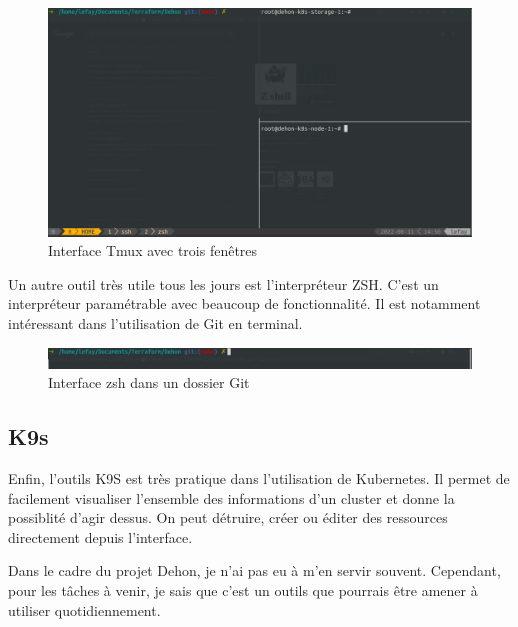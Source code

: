 \documentclass[12pt, a4paper, twoside]{article}
\begin{document}
\begin{figure}[!ht]
    \centering
        \includegraphics[width=\textwidth]{src/interface_tmux.png}
    \caption{Interface Tmux avec trois fenêtres}
    \label{fig:tmux}
\end{figure}

Un autre outil très utile tous les jours est l'interpréteur ZSH.
C'est un interpréteur paramétrable avec beaucoup de fonctionnalité.
Il est notamment intéressant dans l'utilisation de Git en terminal.

\begin{figure}[!ht]
    \centering
        \includegraphics[width=\textwidth]{src/interface_shell.png}
    \caption{Interface zsh dans un dossier Git}
    \label{fig:zsh}
\end{figure}

\newpage
\subsection{K9s}

Enfin, l'outils K9S est très pratique dans l'utilisation de \gls{Kubernetes}.
Il permet de facilement visualiser l'ensemble des informations d'un \gls{cluster} et donne la possiblité d'agir dessus.
On peut détruire, créer ou éditer des ressources directement depuis l'interface.

Dans le cadre du projet Dehon, je n'ai pas eu à m'en servir souvent.
Cependant, pour les tâches à venir, je sais que c'est un outils que pourrais être amener à utiliser quotidiennement.
\end{document}
